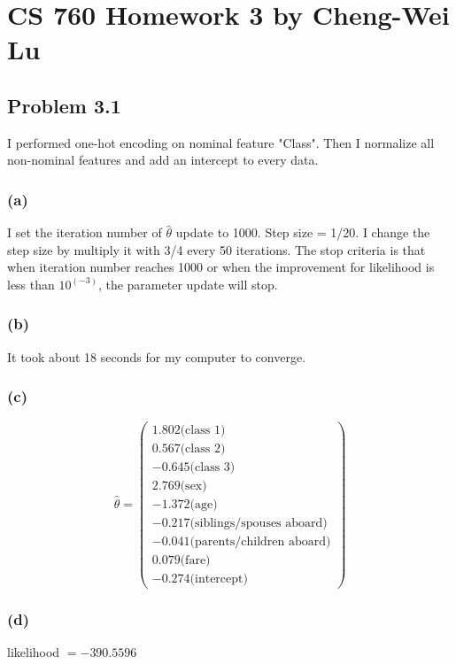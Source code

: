 \documentclass{article}
\begin{document}
\section*{CS 760 Homework 3 by Cheng-Wei Lu}

\subsection*{Problem 3.1}
I performed one-hot encoding on nominal feature "Class". Then I normalize all non-nominal features and add an intercept to every data.

\subsubsection*{(a)}
	I set the iteration number of $\hat{\theta}$ update to 1000. Step size = 1/20. I change the step size by multiply it with 3/4 every 50 iterations. The stop criteria is that when iteration number reaches 1000 or when the improvement for likelihood is less than $10^(-3)$, the parameter update will stop.

\subsubsection*{(b)}
	It took about 18 seconds for my computer to converge.
\subsubsection*{(c)}
	\begin{equation*}
		\hat{\theta} =  \begin{pmatrix} 1.802\text{(class 1)}\\ 0.567 \text{(class 2)}\\ -0.645 \text{(class 3)}\\ 2.769 \text{(sex)}\\ -1.372\text{(age)}\\ -0.217\text{(siblings/spouses aboard)}\\-0.041\text{(parents/children aboard)}\\ 0.079\text{(fare)}\\-0.274\text{(intercept)} \end{pmatrix} 	
		\end{equation*}
	
\subsubsection*{(d)}
	likelihood $ = -390.5596 $
	
\end{document}
